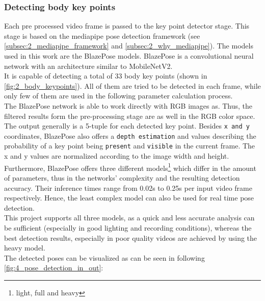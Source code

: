 \subsubsection*{Detecting body key points}\label{subsubsec:4_detecting_body_keypoints}
Each pre processed video frame is passed to the key point detector stage.
This stage is based on the mediapipe pose detection framework (see
\autoref{subsec:2_mediapipe_framework} and \autoref{subsec:2_why_mediapipe}).
The models used in this work are the BlazePose models.
BlazePose is a convolutional neural network with an architecture similar to
MobileNetV2.\\
It is capable of detecting a total of 33 body key points (shown in
\autoref{fig:2_body_keypoints}).
All of them are tried to be detected in each frame, while only few of them are
used in the following parameter calculation process.\\
The BlazePose network is able to work directly with RGB images as.
Thus, the filtered results form the pre-processing stage are as well in the
RGB color space.
The output generally is a 5-tuple for each detected key point.
Besides \texttt{x and y} coordinates, BlazePose also offers a
\texttt{depth estimation} and values describing the probability of a key point
being \texttt{present} and \texttt{visible} in the current frame.
The x and y values are normalized according to the image width and height.
Furthermore, BlazePose offers three different models\footnote{light, full and
heavy} which differ in the amount of parameters, thus in the networks'
complexity and the resulting detection accuracy.
Their inference times range from 0.02s to 0.25s per input video frame
respectively.
Hence, the least complex model can also be used for real time pose detection.\\
This project supports all three models, as a quick and less accurate analysis
can be sufficient (especially in good lighting and recording conditions),
whereas the best detection results, especially in poor quality videos are
achieved by using the heavy model.\\
The detected poses can be visualized as can be seen in following
\autoref{fig:4_pose_detection_in_out}: 

